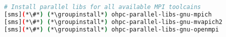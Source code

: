 
\begin{lstlisting}[language=bash,keywords={},upquote=true,keepspaces]
# Install parallel libs for all available MPI toolcains
[sms](*\#*) (*\groupinstall*) ohpc-parallel-libs-gnu-mpich
[sms](*\#*) (*\groupinstall*) ohpc-parallel-libs-gnu-mvapich2
[sms](*\#*) (*\groupinstall*) ohpc-parallel-libs-gnu-openmpi
\end{lstlisting}
